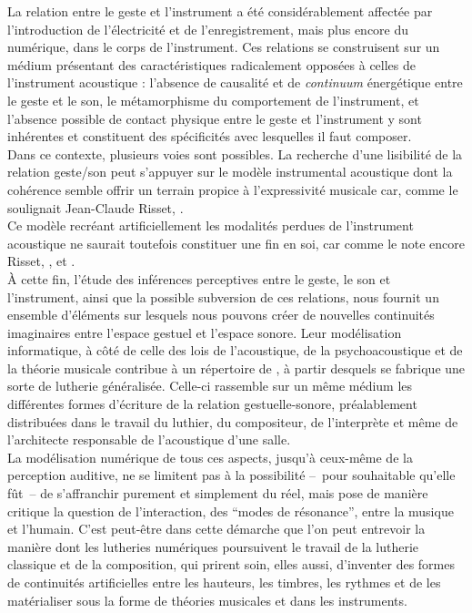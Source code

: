 \noindent La relation entre le geste et l'instrument a été considérablement affectée par l'introduction de l'électricité et de l'enregistrement, mais plus encore du numérique, dans le corps de l'instrument. Ces relations se construisent sur un médium présentant des caractéristiques radicalement opposées à celles de l'instrument acoustique : l'absence de causalité et de \textit{continuum} énergétique entre le geste et le son, le métamorphisme du comportement de l'instrument, et l'absence possible de contact physique entre le geste et l'instrument y sont inhérentes et constituent des spécificités avec lesquelles il faut composer.\\
\indent Dans ce contexte, plusieurs voies sont possibles. La recherche d'une lisibilité de la relation geste/son peut s'appuyer sur le modèle instrumental acoustique dont la cohérence semble offrir un terrain propice à l'expressivité musicale car, comme le soulignait Jean-Claude Risset,  \cite{risset_son_1992}.\\
\indent Ce modèle recréant artificiellement les modalités perdues de l'instrument acoustique ne saurait toutefois constituer une fin en soi, car comme le note encore Risset,  \cite{risset_propos_2010}, et  \cite{risset_son_1992}.\\
\indent À cette fin, l'étude des inférences perceptives entre le geste, le son et l'instrument, ainsi que la possible subversion de ces relations, nous fournit un ensemble d'éléments sur lesquels nous pouvons créer de nouvelles continuités imaginaires entre l'espace gestuel et l'espace sonore. Leur modélisation informatique, à côté de celle des lois de l'acoustique, de la psychoacoustique et de la théorie musicale contribue à un répertoire de , à partir desquels se fabrique une sorte de lutherie généralisée. Celle-ci rassemble sur un même médium les différentes formes d'écriture de la relation gestuelle-sonore, préalablement distribuées dans le travail du luthier, du compositeur, de l'interprète et même de l'architecte responsable de l'acoustique d'une salle.\\
\indent La modélisation numérique de tous ces aspects, jusqu'à ceux-même de la perception auditive, ne se limitent pas à la possibilité --~pour souhaitable qu'elle fût~-- de s'affranchir purement et simplement du réel, mais pose de manière critique la question de l'interaction, des ``modes de résonance'', entre la musique et l'humain. C'est peut-être dans cette démarche que l'on peut entrevoir la manière dont les lutheries numériques poursuivent le travail de la lutherie classique et de la composition, qui prirent soin, elles aussi, d'inventer des formes de continuités artificielles entre les hauteurs, les timbres, les rythmes et de les matérialiser sous la forme de théories musicales et dans les instruments.


